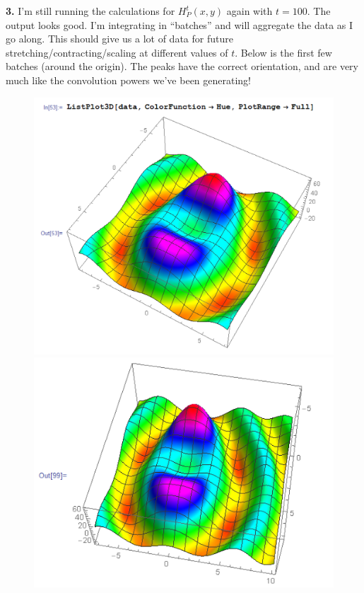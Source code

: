 \documentclass{article}
\theoremstyle{definition}
\begin{document}
\newpage

\noindent \textbf{3.} I'm still running the calculations for $H^t_P(x,y)$ again with $t = 100$. The output looks good. I'm integrating in ``batches'' and will aggregate the data as I go along. This should give us a lot of data for future stretching/contracting/scaling at different values of $t$. Below is the first few batches (around the origin). The peaks have the correct orientation, and are very much like the convolution powers we've been generating!

\begin{figure}[!htb]
	\centering
	\includegraphics[scale=0.15]{conv-6}
	\includegraphics[scale=0.2]{conv-7}

\end{figure}
\end{document}
